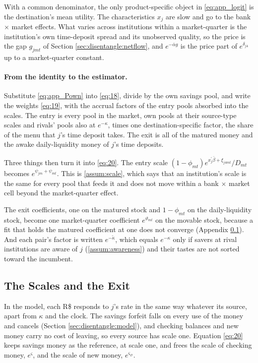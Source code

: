 With a common denominator, the only product-specific object in \eqref{eq:app_logit} is the destination's mean utility. The characteristics $x_j$ are slow and go to the bank $\times$ market effects. What varies across institutions within a market-quarter is the institution's own time-deposit spread and its unobserved quality, so the price is the gap $g_{jmt}$ of Section \ref{sec:disentangle:netflow}, and $e^{-\bar{\alpha}g}$ is the price part of $e^{\delta_{j4}}$ up to a market-quarter constant.

\paragraph{From the identity to the estimator.} Substitute \eqref{eq:app_Pown} into \eqref{eq:18}, divide by the own savings pool, and write the weights \eqref{eq:19}, with the accrual factors of the entry pools absorbed into the scales. The entry is every pool in the market, own pools at their source-type scales and rivals' pools also at $e^{-\kappa}$, times one destination-specific factor, the share of the menu that $j$'s time deposit takes. The exit is all of the matured money and the awake daily-liquidity money of $j$'s time deposits.

Three things then turn it into \eqref{eq:20}. The entry scale $(1-\phi_{mt})e^{x_j^\prime\bar{\beta}+\xi_{j4mt}}/D_{mt}$ becomes $e^{\psi_{jm}+\psi_{mt}}$. This is \ref{assum:scale}, which says that an institution's scale is the same for every pool that feeds it and does not move within a bank $\times$ market cell beyond the market-quarter effect.

The exit coefficients, one on the matured stock and $1-\phi_{mt}$ on the daily-liquidity stock, become one market-quarter coefficient $e^{\vartheta_{mt}}$ on the movable stock, because a fit that holds the matured coefficient at one does not converge (Appendix \ref{app:netflow:terms}). And each pair's factor is written $e^{-\tilde{\kappa}}$, which equals $e^{-\kappa}$ only if savers at rival institutions are aware of $j$ (\ref{assum:awareness}) and their tastes are not sorted toward the incumbent.

\subsection{The Scales and the Exit}\label{app:netflow:terms}

In the model, each R\$ responds to $j$'s rate in the same way whatever its source, apart from $\kappa$ and the clock. The savings forfeit falls on every use of the money and cancels (Section \ref{sec:disentangle:model}), and checking balances and new money carry no cost of leaving, so every source has scale one. Equation \eqref{eq:20} keeps savings money as the reference, at scale one, and frees the scale of checking money, $e^{\varsigma}$, and the scale of new money, $e^{\varsigma_{\varnothing}}$.

